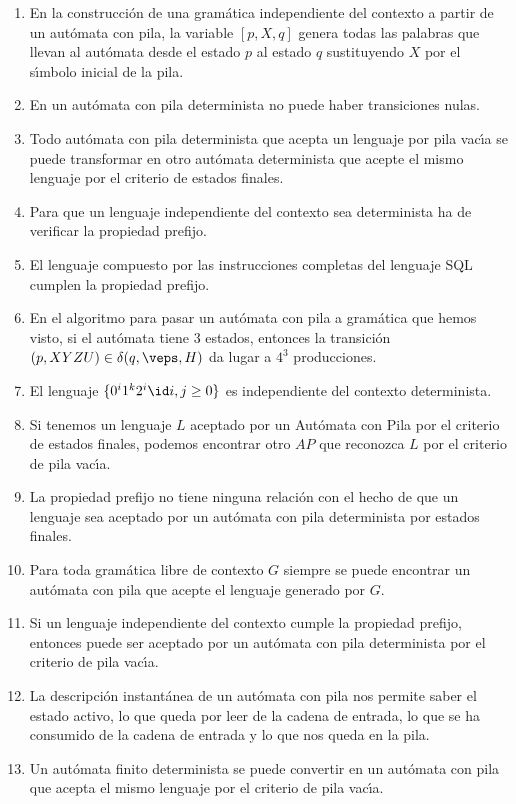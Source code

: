 \begin{enumerate}
    \item En la construcción de una gramática independiente del contexto a partir de un autómata con pila, la variable $[p,X,q]$ genera todas las palabras que llevan al autómata desde el estado $p$ al estado $q$ sustituyendo $X$ por el sı́mbolo inicial de la pila.
    \item En un autómata con pila determinista no puede haber transiciones nulas.
    \item Todo autómata con pila determinista que acepta un lenguaje por pila vacı́a se puede transformar en otro autómata determinista que acepte el mismo lenguaje por el criterio de estados finales.
    \item Para que un lenguaje independiente del contexto sea determinista ha de verificar la propiedad prefijo.
    \item El lenguaje compuesto por las instrucciones completas del lenguaje SQL cumplen la propiedad prefijo.
    \item En el algoritmo para pasar un autómata con pila a gramática que hemos visto, si el autómata tiene 3 estados, entonces la transición $(p,XYZU) \in \delta(q,\veps, H)$ da lugar a $4^3$ producciones.
    \item El lenguaje $\{0^i 1^k 2^i \id i,j\geq 0\}$ es independiente del contexto determinista.
    \item Si tenemos un lenguaje $L$ aceptado por un Autómata con Pila por el criterio de estados finales, podemos encontrar otro $AP$ que reconozca $L$ por el criterio de pila vacı́a.
    \item La propiedad prefijo no tiene ninguna relación con el hecho de que un lenguaje sea aceptado por un autómata con pila determinista por estados finales.
    \item Para toda gramática libre de contexto $G$ siempre se puede encontrar un autómata con pila que acepte el lenguaje generado por $G$.
    \item Si un lenguaje independiente del contexto cumple la propiedad prefijo, entonces puede ser aceptado por un autómata con pila determinista por el criterio de pila vacı́a.
    \item La descripción instantánea de un autómata con pila nos permite saber el estado activo, lo que queda por leer de la cadena de entrada, lo que se ha consumido de la cadena de entrada y lo que nos queda en la pila.
    \item Un autómata finito determinista se puede convertir en un autómata con pila que acepta el mismo lenguaje por el criterio de pila vacı́a.

\end{enumerate}
